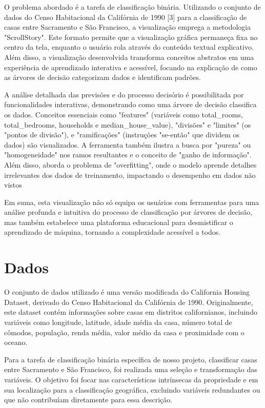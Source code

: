 \documentclass[conference]{IEEEtran}
\begin{document}
O problema abordado é a tarefa de classificação binária. Utilizando o conjunto de dados do Censo Habitacional da Califórnia de 1990 [3]  para a classificação de casas entre Sacramento e São Francisco, a visualização emprega a metodologia "ScrollStory". Este formato permite que a visualização gráfica permaneça fixa no centro da tela, enquanto o usuário rola através do conteúdo textual explicativo. Além disso, a visualização desenvolvida transforma conceitos abstratos em uma experiência de aprendizado interativa e acessível, focando na explicação de como as árvores de decisão categorizam dados e identificam padrões.

A análise detalhada das previsões e do processo decisório é possibilitada por funcionalidades interativas, demonstrando como uma árvore de decisão classifica os dados. Conceitos essenciais como "features" (variáveis como total\_rooms, total\_bedrooms, households e median\_house\_value), "divisões" e "limites" (os "pontos de divisão"), e "ramificações" (instruções "se-então" que dividem os dados) são visualizados. A ferramenta também ilustra a busca por "pureza" ou "homogeneidade" nos ramos resultantes e o conceito de "ganho de informação". Além disso, aborda o problema de "overfitting", onde o modelo aprende detalhes irrelevantes dos dados de treinamento, impactando o desempenho em dados não vistos

Em suma, esta visualização não só equipa os usuários com ferramentas para uma análise profunda e intuitiva do processo de classificação por árvores de decisão, mas também estabelece uma plataforma educacional para desmistificar o aprendizado de máquina, tornando a complexidade acessível a todos.

\section{Dados}
O conjunto de dados utilizado é uma versão modificada do California Housing Dataset, derivado do Censo Habitacional da Califórnia de 1990. Originalmente, este dataset contém informações sobre casas em distritos californianos, incluindo variáveis como longitude, latitude, idade média da casa, número total de cômodos, população, renda média, valor médio da casa e proximidade com o oceano.

Para a tarefa de classificação binária específica de nosso projeto, classificar casas entre Sacramento e São Francisco, foi realizada uma seleção e transformação das variáveis. O objetivo foi focar nas características intrínsecas da propriedade e em sua localização para a classificação geográfica, excluindo variáveis redundantes ou que não contribuíam diretamente para essa descrição.
\end{document}
